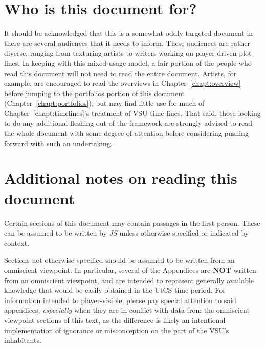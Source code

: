 \section*{Who is this document for?}
It should be acknowledged that this is a somewhat oddly targeted
document in there are several audiences that it needs to inform. These
audiences are rather diverse, ranging from texturing artists to
writers working on player-driven plot-lines. In keeping with this
mixed-usage model, a fair portion of the people who read this document
will not need to read the entire document. Artists, for example, are
encouraged to read the overviews in Chapter~\ref{chapt:overview}
before jumping to the portfolios portion of this document
(Chapter~\ref{chapt:portfolios}), but may find little use for much of
Chapter~\ref{chapt:timelines}'s treatment of VSU time-lines. That said,
those looking to do any additional fleshing out of the framework are
strongly-advised to read the whole document with some degree of
attention before considering pushing forward with such an undertaking.

\section*{Additional notes on reading this document}
Certain sections of this document may contain passages in the first
person. These can be assumed to be written by {\it JS} unless
otherwise specified or indicated by context. 

Sections not otherwise
specified should be assumed to be written from an omniscient
viewpoint. In particular, several of the Appendices are {\bf NOT}
written from an omniscient viewpoint, and are intended to represent
generally available knowledge that would be easily obtained in the
UtCS time period. For information intended to player-visible, please
pay special attention to said appendices, {\it especially} when they
are in conflict with data from the omniscient viewpoint sections of
this text, as the difference is likely an intentional implementation
of ignorance or misconception on the part of the VSU's inhabitants.

